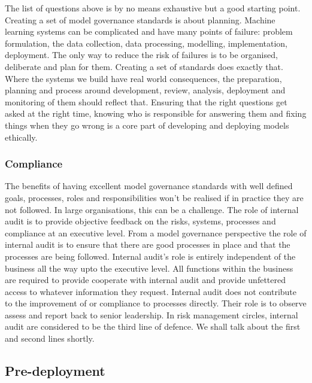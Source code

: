 The list of questions above is by no means exhaustive but a good starting point. Creating a set of model governance standards is about planning. Machine learning systems can be complicated and have many points of failure: problem formulation, the data collection, data processing, modelling, implementation, deployment. The only way to reduce the risk of failures is to be organised, deliberate and plan for them. Creating a set of standards does exactly that. Where the systems we build have real world consequences, the preparation, planning and process around development, review, analysis, deployment and monitoring of them should reflect that. Ensuring that the right questions get asked at the right time, knowing who is responsible for answering them and fixing things when they go wrong is a core part of developing and deploying models ethically.

\subsubsection*{Compliance}

The benefits of having excellent model governance standards with well defined goals, processes, roles and responsibilities won't be realised if in practice they are not followed. In large organisations, this can be a challenge. The role of internal audit is to provide objective feedback on the risks, systems, processes and compliance at an executive level. From a model governance perspective the role of internal audit is to ensure that there are good processes in place and that the processes are being followed. Internal audit's role is entirely independent of the business all the way upto the executive level. All functions within the business are required to provide cooperate with internal audit and provide unfettered access to whatever information they request. Internal audit does not contribute to the improvement of or compliance to processes directly. Their role is to observe assess and report back to senior leadership. In risk management circles, internal audit are considered to be the third line of defence. We shall talk about the first and second lines shortly.

\subsection{Pre-deployment}

